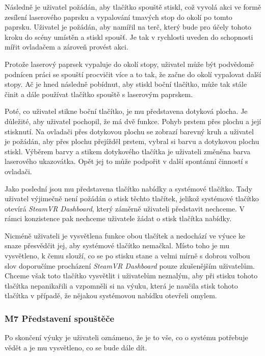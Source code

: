 Následně je uživatel požádán, aby tlačítko spouště stiskl, což vyvolá
akci ve formě zesílení laserového paprsku a vypalování tmavých stop do
okolí po tomto paprsku. Uživatel je požádán, aby namířil na terč, který
bude pro účely tohoto kroku do scény umístěn a stiskl spoušť. Je tak v
rychlosti uveden do schopnosti mířit ovladačem a zároveň provést akci.

Protože laserový paprsek vypaluje do okolí stopy, uživatel může být
podvědomě podnícen práci se spouští procvičit více a to tak, že začne do
okolí vypalovat další stopy. Ač je hned následně pobídnut, aby stiskl
boční tlačítko, může tak stále činit a dále používat tlačítko spouště s
laserovým paprskem.

Poté, co uživatel stikne boční tlačítko, je mu představena dotyková
plocha. Je důležité, aby uživatel pochopil, že má dvě funkce. Pohyb
prstem přes plochu a její stisknutí. Na ovladači přes dotykovou plochu
se zobrazí barevný kruh a uživatel je požádán, aby přes plochu přejížděl
prstem, vybral si barvu a dotykovou plochu stiskl. Výběrem barvy a
stikem dotykového tlačítka je uživateli změněna barva laserového
ukazovátka. Opět jej to může podpořit v další spontánní činností s
ovladači.

Jako poslední jsou mu představena tlačítko nabídky a systémové tlačítko.
Tady uživatel výjimečně není požádán o stisk těchto tlačítek, jelikož
systémové tlačítko otevírá \emph{SteamVR Dashboard}, který záměrně
uživateli představit nechceme. V rámci konzistence pak nechceme
uživatele žádat o stisk tlačítka nabídky.

Nicméně uživateli je vysvětlena funkce obou tlačítek a nedochází ve
výuce ke snaze přesvědčit jej, aby systémové tlačítko nemačkal. Místo
toho je mu vysvětleno, k čemu slouží, co se po stisku stane a velmi
mírně s dobrou volbou slov doporučíme procházení \emph{SteamVR
Dashboard} pouze zkušenějším uživatelům. Chceme však toto tlačítko
vysvětlit i uživatelům neznalým, aby při stisku tohoto tlačítka
nepanikařili a vzpomněli si na výuku, která je naučila stisk tohoto
tlačítka v případě, že nějakou systémovou nabídku otevřeli omylem.

\subsubsection{M7 Představení
spouštěče}\label{m7-pux159edstavenuxed-spouux161tux11bux10de}

Po skončení výuky je uživateli oznámeno, že je to vše, co o systému
potřebuje vědět a je mu vysvětleno, co se bude dále dít.

